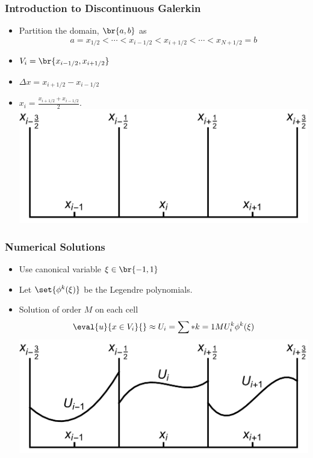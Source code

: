 \documentclass[10pt]{beamer}
\begin{document}
    \begin{frame}
      \frametitle{Introduction to Discontinuous Galerkin}
      \begin{itemize}
        \item Partition the domain, $\br{a, b}$ as
          \[
            a = x_{1/2} < \cdots < x_{i-1/2} < x_{i+1/2} < \cdots < x_{N + 1/2} = b
          \]

        \item $V_i = \br{x_{i-1/2}, x_{i+1/2}}$
        \item $\Delta x = x_{i + 1/2} - x_{i - 1/2}$
        \item $x_i = \frac{x_{i+1/2} + x_{i-1/2}}{2}$.
          \includegraphics[scale=0.35]{Figures/Cells.pdf}
      \end{itemize}
    \end{frame}

    \begin{frame}
      \frametitle{Numerical Solutions}
      \begin{itemize}
        \item Use canonical variable $\xi \in \br{-1, 1}$
        \item Let $\set{\phi^k(\xi)}$ be the Legendre polynomials.

        \item Solution of order $M$ on each cell
          \[
            \eval{u}{x \in V_i}{} \approx U_i = \sum*{k = 1}{M}{U_i^k \phi^k(\xi)}
          \]
          \includegraphics[scale=0.35]{Figures/DG.pdf}
      \end{itemize}
    \end{frame}
\end{document}
